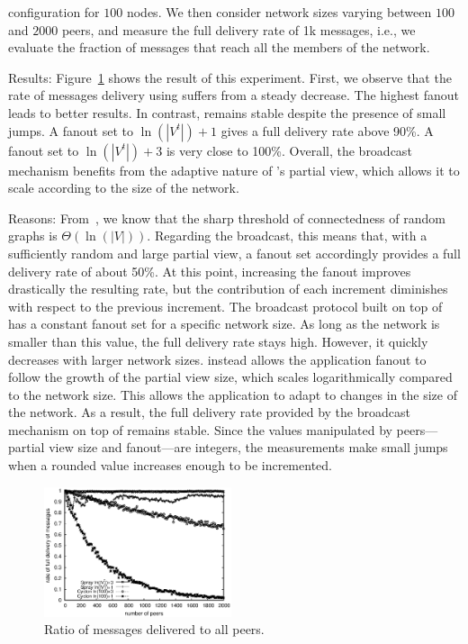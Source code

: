 \begin{asparadesc}
  configuration for $100$ nodes.  We then consider network sizes
  varying between $100$ and $2000$ peers, and measure the full
  delivery rate of 1k messages, i.e., we evaluate the fraction of
  messages that reach all the members of the network.
\item [Results:] Figure~\ref{fig:hardrate} shows the result of this
  experiment. First, we observe that the rate of messages delivery
  using \CYCLON suffers from a steady decrease. The highest fanout
  leads to better results. In contrast, \SPRAY remains stable despite
  the presence of small jumps. A fanout set to $\ln(|V^t|)+1$ gives a
  full delivery rate above 90\%. A fanout set to $\ln(|V^t|)+3$ is
  very close to 100\%. Overall, the broadcast mechanism benefits from
  the adaptive nature of \SPRAY's partial view, which allows it to
  scale according to the size of the network.
\item [Reasons:] From~\cite{erdos1959random}, we know that the sharp
  threshold of connectedness of random graphs is
  $\Theta(\ln(|V|))$. Regarding the broadcast, this means that, with a
  sufficiently random and large partial view, a fanout set accordingly
  provides a full delivery rate of about 50\%. At this point,
  increasing the fanout improves drastically the resulting rate, but
  the contribution of each increment diminishes with respect to the
  previous increment. The broadcast protocol built on top of \CYCLON
  has a constant fanout set for a specific network size. As long as
  the network is smaller than this value, the full delivery rate stays
  high. However, it quickly decreases with larger network sizes.
  \SPRAY instead allows the application fanout to follow the growth of
  the partial view size, which scales logarithmically compared to the
  network size. This allows the application to adapt to changes in the
  size of the network. As a result, the full delivery rate provided by
  the broadcast mechanism on top of \SPRAY remains stable. Since the
  values manipulated by peers---partial view size and fanout---are
  integers, the measurements make small jumps when a rounded value
  increases enough to be incremented.
\end{asparadesc}

\begin{figure}
  \begin{center}
    \includegraphics[width=0.49\textwidth]{img/hardrate.eps}
    \caption{\label{fig:hardrate}Ratio of messages delivered to all peers.}
  \end{center}
\end{figure}


